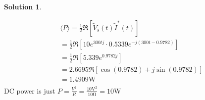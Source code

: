 \documentclass[10pt]{article}
\theoremstyle{definition}
\newtheorem{soln}{Solution}
\newcommand{\ti}[1]{\widetilde{#1}}
\begin{document}
\begin{soln}
\begin{enumerate}[label=(\alph*)]
\begin{align*}
             & \langle P \rangle = \frac{1}{2}\Re\left[\ti{V}_s(t)\ti{I}^*(t)\right]  \\
             & = \frac{1}{2}\Re\left[10e^{300tj}\cdot0.5339e^{-j(300t-0.9782)}\right] \\
             & = \frac{1}{2}\Re\left[5.339e^{0.9782j}\right]                          \\
             & = 2.6695\Re\left[\cos(0.9782)+j\sin(0.9782)\right]                     \\
             & = 1.4909\unit{\watt}                                                   \\
          \end{align*}
          DC power is just $P=\frac{V^2}{R}=\frac{10\unit{\volt}^2}{10\unit{\ohm}}=10\unit{\watt}$
  \end{enumerate}
\end{soln}
\newpage
\end{document}
